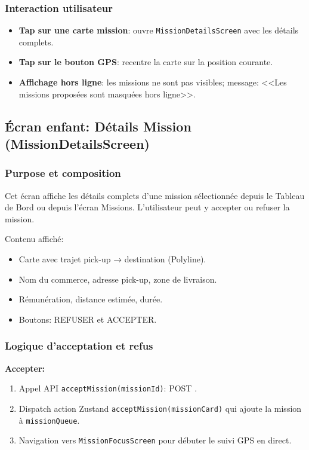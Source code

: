 \subsubsection{Interaction utilisateur}

\begin{itemize}
    \item \textbf{Tap sur une carte mission}: ouvre \texttt{MissionDetailsScreen} avec les détails complets.
    \item \textbf{Tap sur le bouton GPS}: recentre la carte sur la position courante.
    \item \textbf{Affichage hors ligne}: les missions ne sont pas visibles; message: <<Les missions proposées sont masquées hors ligne>>.
\end{itemize}

\subsection{Écran enfant: Détails Mission (MissionDetailsScreen)}

\subsubsection{Purpose et composition}

Cet écran affiche les détails complets d'une mission sélectionnée depuis le Tableau de Bord ou depuis l'écran Missions. L'utilisateur peut y accepter ou refuser la mission.

Contenu affiché:
\begin{itemize}
    \item Carte avec trajet pick-up → destination (Polyline).
    \item Nom du commerce, adresse pick-up, zone de livraison.
    \item Rémunération, distance estimée, durée.
    \item Boutons: REFUSER et ACCEPTER.
\end{itemize}

\subsubsection{Logique d'acceptation et refus}

\textbf{Accepter:}
\begin{enumerate}
    \item Appel API \texttt{acceptMission(missionId)}: POST .
    \item Dispatch action Zustand \texttt{acceptMission(missionCard)} qui ajoute la mission à \texttt{missionQueue}.
    \item Navigation vers \texttt{MissionFocusScreen} pour débuter le suivi GPS en direct.
\end{enumerate}

